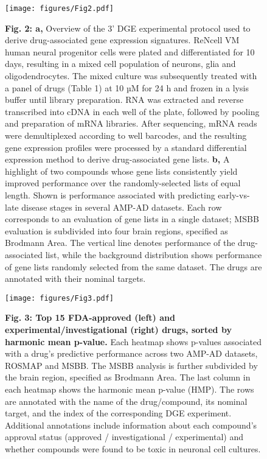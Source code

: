 \documentclass{article}
\begin{document}
\begin{figure}
  \texttt{[image: figures/Fig2.pdf]}
  \caption*{\textbf{Fig. 2: a,} Overview of the 3’ DGE experimental protocol used to derive drug-associated gene expression signatures. ReNcell VM human neural progenitor cells were plated and differentiated for 10 days, resulting in a mixed cell population of neurons, glia and oligodendrocytes. The mixed culture was subsequently treated with a panel of drugs (Table 1) at 10 µM for 24 h and frozen in a lysis buffer until library preparation. RNA was extracted and reverse transcribed into cDNA in each well of the plate, followed by pooling and preparation of mRNA libraries. After sequencing, mRNA reads were demultiplexed according to well barcodes, and the resulting gene expression profiles were processed by a standard differential expression method to derive drug-associated gene lists. \textbf{b,} A highlight of two compounds whose gene lists consistently yield improved performance over the randomly-selected lists of equal length. Shown is performance associated with predicting early-vs-late disease stages in several AMP-AD datasets. Each row corresponds to an evaluation of gene lists in a single dataset; MSBB evaluation is subdivided into four brain regions, specified as Brodmann Area. The vertical line denotes performance of the drug-associated list, while the background distribution shows performance of gene lists randomly selected from the same dataset. The drugs are annotated with their nominal targets.}
\end{figure}


\begin{landscape}
  \begin{figure}
    \begin{center}
      \texttt{[image: figures/Fig3.pdf]}
    \end{center}
    \caption*{\textbf{Fig. 3: Top 15 FDA-approved (left) and experimental/investigational (right) drugs, sorted by harmonic mean p-value.} Each heatmap shows p-values associated with a drug’s predictive performance across two AMP-AD datasets, ROSMAP and MSBB. The MSBB analysis is further subdivided by the brain region, specified as Brodmann Area. The last column in each heatmap shows the harmonic mean p-value (HMP). The rows are annotated with the name of the drug/compound, its nominal target, and the index of the corresponding DGE experiment. Additional annotations include information about each compound’s approval status (approved / investigational / experimental) and whether compounds were found to be toxic in neuronal cell cultures.}
\end{figure}
\end{landscape}
\end{document}
